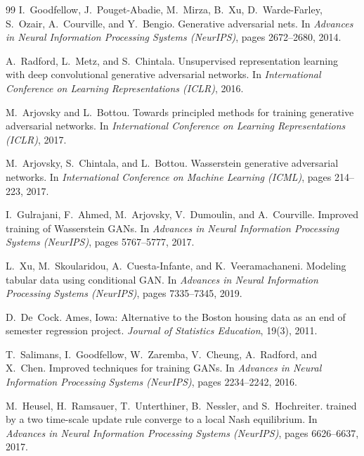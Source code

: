 \documentclass[11pt,letterpaper]{article}
\begin{document}
\begin{thebibliography}{99}
I.~Goodfellow, J.~Pouget-Abadie, M.~Mirza, B.~Xu, D.~Warde-Farley, S.~Ozair, A.~Courville, and Y.~Bengio.
\newblock Generative adversarial nets.
\newblock In \emph{Advances in Neural Information Processing Systems (NeurIPS)}, pages 2672--2680, 2014.

A.~Radford, L.~Metz, and S.~Chintala.
\newblock Unsupervised representation learning with deep convolutional generative adversarial networks.
\newblock In \emph{International Conference on Learning Representations (ICLR)}, 2016.

M.~Arjovsky and L.~Bottou.
\newblock Towards principled methods for training generative adversarial networks.
\newblock In \emph{International Conference on Learning Representations (ICLR)}, 2017.

M.~Arjovsky, S.~Chintala, and L.~Bottou.
\newblock Wasserstein generative adversarial networks.
\newblock In \emph{International Conference on Machine Learning (ICML)}, pages 214--223, 2017.

I.~Gulrajani, F.~Ahmed, M.~Arjovsky, V.~Dumoulin, and A.~Courville.
\newblock Improved training of {Wasserstein} {GANs}.
\newblock In \emph{Advances in Neural Information Processing Systems (NeurIPS)}, pages 5767--5777, 2017.

L.~Xu, M.~Skoularidou, A.~Cuesta-Infante, and K.~Veeramachaneni.
\newblock Modeling tabular data using conditional {GAN}.
\newblock In \emph{Advances in Neural Information Processing Systems (NeurIPS)}, pages 7335--7345, 2019.

D.~De~Cock.
\newblock Ames, Iowa: Alternative to the Boston housing data as an end of semester regression project.
\newblock \emph{Journal of Statistics Education}, 19(3), 2011.

T.~Salimans, I.~Goodfellow, W.~Zaremba, V.~Cheung, A.~Radford, and X.~Chen.
\newblock Improved techniques for training {GANs}.
\newblock In \emph{Advances in Neural Information Processing Systems (NeurIPS)}, pages 2234--2242, 2016.

M.~Heusel, H.~Ramsauer, T.~Unterthiner, B.~Nessler, and S.~Hochreiter.
 trained by a two time-scale update rule converge to a local {Nash} equilibrium.
\newblock In \emph{Advances in Neural Information Processing Systems (NeurIPS)}, pages 6626--6637, 2017.
\end{thebibliography}
\end{document}
